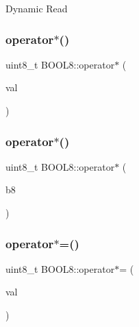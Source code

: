 Dynamic Read \hypertarget{struct_b_o_o_l8_a556d8bc5696eb10ca874450f39cc9d68}{}\label{struct_b_o_o_l8_a556d8bc5696eb10ca874450f39cc9d68} 
\subsubsection{\texorpdfstring{operator$\ast$()}{operator*()}\hspace{0.1cm}{\footnotesize\ttfamily [1/2]}}
{\footnotesize\ttfamily uint8\+\_\+t B\+O\+O\+L8\+::operator$\ast$ (\begin{DoxyParamCaption}\item[{const uint8\+\_\+t}]{val }\end{DoxyParamCaption})\hspace{0.3cm}{\ttfamily [inline]}}

\hypertarget{struct_b_o_o_l8_a2003637ede278ccb57884ccec54f88dc}{}\label{struct_b_o_o_l8_a2003637ede278ccb57884ccec54f88dc} 
\subsubsection{\texorpdfstring{operator$\ast$()}{operator*()}\hspace{0.1cm}{\footnotesize\ttfamily [2/2]}}
{\footnotesize\ttfamily uint8\+\_\+t B\+O\+O\+L8\+::operator$\ast$ (\begin{DoxyParamCaption}\item[{const \hyperlink{struct_b_o_o_l8}{B\+O\+O\+L8}}]{b8 }\end{DoxyParamCaption})\hspace{0.3cm}{\ttfamily [inline]}}

\hypertarget{struct_b_o_o_l8_ab3f40d0f3d8df20a843eee81af6646da}{}\label{struct_b_o_o_l8_ab3f40d0f3d8df20a843eee81af6646da} 
\subsubsection{\texorpdfstring{operator$\ast$=()}{operator*=()}\hspace{0.1cm}{\footnotesize\ttfamily [1/2]}}
{\footnotesize\ttfamily uint8\+\_\+t B\+O\+O\+L8\+::operator$\ast$= (\begin{DoxyParamCaption}\item[{const uint8\+\_\+t}]{val }\end{DoxyParamCaption})\hspace{0.3cm}{\ttfamily [inline]}}

